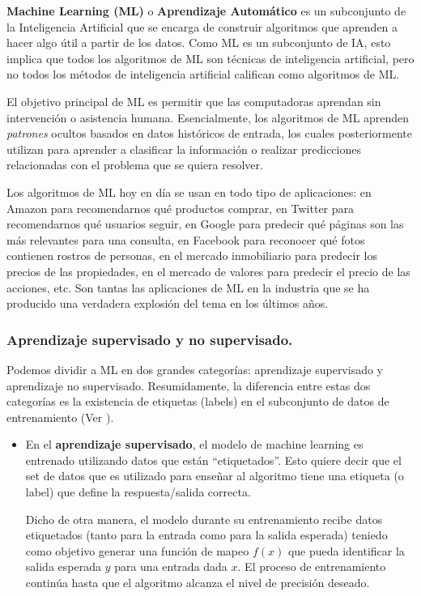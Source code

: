 \documentclass[12pt,a4paper]{article}
\begin{document}
\begin{sloppypar}
\textbf{Machine Learning (ML)} o \textbf{Aprendizaje Automático} es un subconjunto de la Inteligencia Artificial que se encarga de construir algoritmos que aprenden a hacer algo útil a partir de los datos. 
Como ML es un subconjunto de IA, esto implica que todos los algoritmos de ML son técnicas de inteligencia artificial, pero no todos los métodos de inteligencia artificial califican como algoritmos de ML.

El objetivo principal de ML es permitir que las computadoras aprendan sin intervención o asistencia humana.
Esencialmente, los algoritmos de ML aprenden \textit{patrones} ocultos basados en datos históricos de entrada, los cuales posteriormente utilizan para aprender a clasificar la información o realizar predicciones relacionadas con el problema que se quiera resolver. 

Los algoritmos de ML hoy en día se usan en todo tipo de aplicaciones: en Amazon para recomendarnos qué productos comprar, en Twitter para recomendarnos qué usuarios seguir, en Google para predecir qué páginas son las más relevantes para una consulta, en Facebook para reconocer qué fotos contienen rostros de personas, en el mercado inmobiliario para predecir los precios de las propiedades, en el mercado de valores para predecir el precio de las acciones, etc. Son tantas las aplicaciones de ML en la industria que se ha producido una verdadera explosión del tema en los últimos años\cite{apunte_uba}.

\cleardoublepage
\subsubsection{Aprendizaje supervisado y no supervisado.}

Podemos dividir a ML en dos grandes categorías: aprendizaje supervisado y aprendizaje no supervisado. Resumidamente, la diferencia entre estas dos categorías es la existencia de etiquetas (labels) en el subconjunto de datos de entrenamiento (Ver \textit{}).

\begin{itemize}
\item En el \textbf{aprendizaje supervisado}\cite{intro_clasificacion_ML}, el modelo de machine learning es entrenado utilizando datos que están “etiquetados”. Esto quiere decir que el set de datos que es utilizado para enseñar al algoritmo tiene una etiqueta (o label) que define la respuesta/salida correcta. 

Dicho de otra manera, el modelo durante su entrenamiento recibe datos etiquetados (tanto para la entrada como para la salida esperada) teniedo como objetivo generar una función de mapeo $f(x)$ que pueda identificar la salida esperada $y$ para una entrada dada $x$. El proceso de entrenamiento continúa hasta que el algoritmo alcanza el nivel de precisión deseado. 


\end{itemize}
\end{sloppypar}
\end{document}
